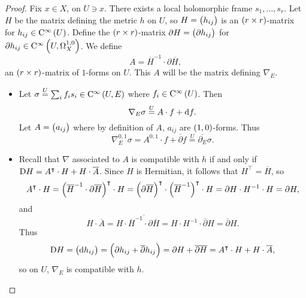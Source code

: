 \begin{proof}
Fix $ x \in X $, on $ U \ni x $. There exists a local holomorphic frame $ s_1, \dots, s_r $. Let $ H $ be the matrix defining the metric $ h $ on $ U $, so $ H = \br{h_{ij}} $ is an $ \br{r \times r} $-matrix for $ h_{ij} \in \C^\infty\br{U} $. Define the $ \br{r \times r} $-matrix $ \partial H = \br{\partial h_{ij}} $ for $ \partial h_{ij} \in \C^\infty\br{U, \Omega_X^{1, 0}} $. We define
$$ A = \overline{H}^{-1} \cdot \partial\overline{H}, $$
an $ \br{r \times r} $-matrix of $ 1 $-forms on $ U $. This $ A $ will be the matrix defining $ \nabla_E $.
\begin{itemize}
\item Let $ \sigma \overset{U}{=} \sum_i f_is_i \in \C^\infty\br{U, E} $ where $ f_i \in \C^\infty\br{U} $. Then
$$ \nabla_E\sigma \overset{U}{=} A \cdot f + \mathrm{d} f. $$
Let $ A = \br{a_{ij}} $ where by definition of $ A $, $ a_{ij} $ are $ \br{1, 0} $-forms. Thus
$$ \nabla_E^{0, 1}\sigma = A^{0, 1} \cdot f + \overline{\partial}f \overset{U}{=} \overline{\partial_E}\sigma. $$

\pagebreak

\item Recall that $ \nabla $ associated to $ A $ is compatible with $ h $ if and only if $ \mathrm{D} H = A^\intercal \cdot H + H \cdot \overline{A} $. Since $ H $ is Hermitian, it follows that $ H^\intercal = \overline{H} $, so
$$ A^\intercal \cdot H = \br{\overline{H}^{-1} \cdot \partial\overline{H}}^\intercal \cdot H = \br{\partial\overline{H}}^\intercal \cdot \br{\overline{H}^{-1}}^\intercal \cdot H = \partial H \cdot H^{-1} \cdot H = \partial H, $$
and
$$ H \cdot \overline{A} = H \cdot \overline{\overline{H}^{-1} \cdot \partial\overline{H}} = H \cdot H^{-1} \cdot \overline{\partial} H = \overline{\partial} H. $$
Thus
$$ \D H = \br{\d h_{ij}} = \br{\partial h_{ij} + \overline{\partial}h_{ij}} = \partial H + \overline{\partial H} = A^\intercal \cdot H + H \cdot \overline{A}, $$
so on $ U $, $ \nabla_E $ is compatible with $ h $.



\end{itemize}
\end{proof}
